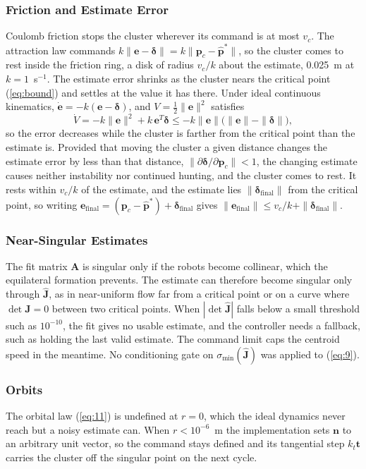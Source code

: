 \documentclass[lettersize,journal]{IEEEtran}
\begin{document}
\subsubsection{Friction and Estimate Error}
Coulomb friction stops the cluster wherever its command is at most $v_c$. The attraction law commands $k\|\mathbf{e} - \boldsymbol{\delta}\| = k\|\mathbf{p}_c - \hat{\mathbf{p}}^*\|$, so the cluster comes to rest inside the friction ring, a disk of radius $v_c/k$ about the estimate, 0.025~m at $k = 1$~s$^{-1}$. The estimate error shrinks as the cluster nears the critical point (\ref{eq:bound}) and settles at the value it has there. Under ideal continuous kinematics, $\dot{\mathbf{e}} = -k(\mathbf{e} - \boldsymbol{\delta})$, and $V = \frac{1}{2}\|\mathbf{e}\|^2$ satisfies
\[
\dot{V} = -k\|\mathbf{e}\|^2 + k\,\mathbf{e}^T\boldsymbol{\delta} \le -k\|\mathbf{e}\|\bigl(\|\mathbf{e}\| - \|\boldsymbol{\delta}\|\bigr),
\]
so the error decreases while the cluster is farther from the critical point than the estimate is. Provided that moving the cluster a given distance changes the estimate error by less than that distance, $\|\partial\boldsymbol{\delta}/\partial\mathbf{p}_c\| < 1$, the changing estimate causes neither instability nor continued hunting, and the cluster comes to rest. It rests within $v_c/k$ of the estimate, and the estimate lies $\|\boldsymbol{\delta}_{\text{final}}\|$ from the critical point, so writing $\mathbf{e}_{\text{final}} = (\mathbf{p}_c - \hat{\mathbf{p}}^*) + \boldsymbol{\delta}_{\text{final}}$ gives $\|\mathbf{e}_{\text{final}}\| \le v_c/k + \|\boldsymbol{\delta}_{\text{final}}\|$.

\subsubsection{Near-Singular Estimates}
The fit matrix $\mathbf{A}$ is singular only if the robots become collinear, which the equilateral formation prevents. The estimate can therefore become singular only through $\hat{\mathbf{J}}$, as in near-uniform flow far from a critical point or on a curve where $\det\mathbf{J} = 0$ between two critical points. When $|\det\hat{\mathbf{J}}|$ falls below a small threshold such as $10^{-10}$, the fit gives no usable estimate, and the controller needs a fallback, such as holding the last valid estimate.
The command limit caps the centroid speed in the meantime. No conditioning gate on $\sigma_{\min}(\hat{\mathbf{J}})$ was applied to (\ref{eq:9}).

\subsubsection{Orbits}
The orbital law (\ref{eq:11}) is undefined at $r = 0$, which the ideal dynamics never reach but a noisy estimate can. When $r < 10^{-6}$~m the implementation sets $\mathbf{n}$ to an arbitrary unit vector, so the command stays defined and its tangential step $k_t\mathbf{t}$ carries the cluster off the singular point on the next cycle.
\end{document}
